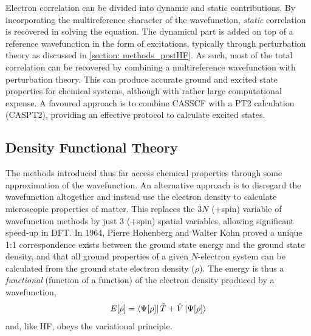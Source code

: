 Electron correlation can be divided into dynamic and static contributions. By incorporating the multireference character of the wavefunction, \textit{static} correlation is recovered in solving the \schro{} equation. The dynamical part is added on top of a reference wavefunction in the form of excitations, typically through perturbation theory as discussed in \ref{section: methods_postHF}. As such, most of the total correlation can be recovered by combining a multireference wavefunction with perturbation theory. This can produce accurate ground and excited state properties for chemical systems, although with rather large computational expense.\cite{Ramos-Cordoba2017,Stein2016a} A favoured approach is to combine \ac{CAS}\ac{SCF} with a \ac{PT2} calculation (\ac{CAS}\ac{PT2}), providing an effective protocol to calculate excited states. 
\subsection{Density Functional Theory}\label{section: theory_dft}
The methods introduced thus far access chemical properties through some approximation of the wavefunction. An alternative approach is to disregard the wavefunction altogether and instead use the electron density to calculate microscopic properties of matter. This replaces the 3$N$ (+spin) variable of wavefunction methods by just 3 (+spin) spatial variables, allowing significant speed-up in \ac{DFT}. In 1964, Pierre Hohenberg and Walter Kohn proved a unique 1:1 correspondence exists between the ground state energy and the ground state density, and that all ground properties of a given $N$-electron system can be calculated from the ground state electron density ($\rho$).\cite{Kohn1964} The energy is thus a \textit{functional} (function of a function) of the electron density produced by a wavefunction,
\begin{equation}
    E[\rho]=\bra{\Psi[\rho]}\hat{T}+\hat{V}\ket{\Psi[\rho]}
\end{equation}
and, like \ac{HF}, obeys the variational principle.

